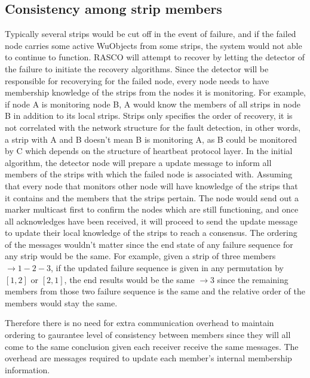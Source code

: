 \subsection{Consistency among strip members}

Typically several strips would be cut off in the event of failure, and if the
failed node carries some active WuObjects from some strips, the system would
not able to continue to function. RASCO will attempt to recover by letting the
detector of the failure to initiate the recovery algorithms.
Since the detector will be responsible for recoverying for the failed node,
every node needs to have membership knowledge of the strips from the nodes it
is monitoring. For example, if node A is monitoring node B, A would know the
members of all strips in node B in addition to its local strips. Strips only
specifies the order of recovery, it is not correlated with the network
structure for the fault detection, in other words, a strip with A and B doesn't
mean B is monitoring A, as B could be monitored by C which depends on the
structure of heartbeat protocol layer.
In the initial algorithm, the detector node will prepare a update message to
inform all members of the strips with which the failed node is associated with.
Assuming that every node that monitors other node will have knowledge of the
strips that it contains and the members that the strips pertain. The node would
send out a marker multicast first to confirm the nodes which are still
functioning, and once all acknowledges have been received, it will proceed to
send the update message to update their local knowledge of the strips to reach
a consensus. The ordering of the messages wouldn't matter since the end state
of any failure sequence for any strip would be the same. For example, given
a strip of three members $\rightarrow 1-2-3$, if the updated failure sequence
is given in any permutation by $[1, 2]$ or $[2, 1]$, the end results would be
the same $\rightarrow 3$ since the remaining members from those two failure
sequence is the same and the relative order of the members would stay the same.

Therefore there is no need for extra communication overhead to maintain
ordering to gaurantee level of consistency between members since they will all
come to the same conclusion given each receiver receive the same messages. The
overhead are messages required to update each member's internal membership
information.

